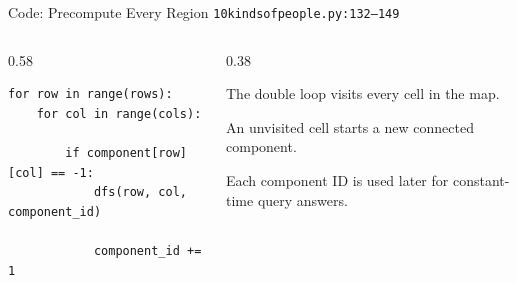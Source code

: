 \documentclass[aspectratio=169,11pt]{beamer}
\begin{document}
\begin{frame}[fragile]{Code: Precompute Every Region}
\scriptsize
{} \texttt{10kindsofpeople.py:132--149}

\vspace{0.08cm}
\begin{columns}[T,totalwidth=\textwidth]
\begin{column}{0.58\textwidth}
\begin{lstlisting}[style=cpcode]
for row in range(rows):
    for col in range(cols):

        if component[row][col] == -1:
            dfs(row, col, component_id)

            component_id += 1
\end{lstlisting}
\end{column}
\begin{column}{0.38\textwidth}
\begin{tightitemize}
  \item The double loop visits every cell in the map.
  \item An unvisited cell starts a new connected component.
  \item Each component ID is used later for constant-time query answers.
\end{tightitemize}
\end{column}
\end{columns}
\end{frame}
\end{document}
